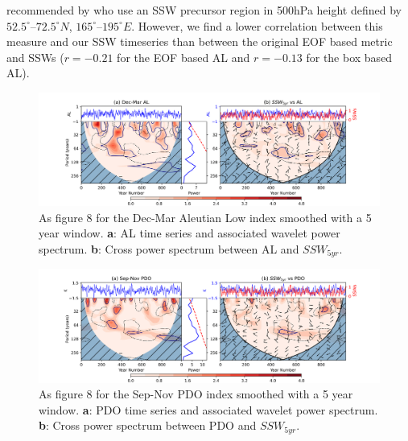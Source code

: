 recommended by \cite{Garfinkel2012whymight} who use an SSW precursor region in 500hPa height defined by $52.5^{\circ}$–$72.5^{\circ}N$, $165^{\circ}$–$195^{\circ}E$. However, we find a lower correlation between this measure and our SSW timeseries than between the original EOF based metric and SSWs ($r = -0.21$ for the EOF based AL and $r = -0.13$ for the box based AL).


\begin{figure}[h!]
\begin{center}
\includegraphics[width = \linewidth]{Figures/Figures-origins/AL_wavelet_combined.png}
\caption{As figure 8 for the Dec-Mar Aleutian Low index smoothed with a 5 year window. \textbf{a}: AL time series and associated wavelet power spectrum. \textbf{b}: Cross power spectrum between AL and $SSW_{5yr}$.}
\label{fig:AL_wavelet}
\end{center}
\end{figure}

\begin{figure}[h!]
\begin{center}
\includegraphics[width = \linewidth]{Figures/Figures-origins/PDO_wavelet_combined.png}
\caption{As figure 8 for the Sep-Nov PDO index smoothed with a 5 year window. \textbf{a}: PDO time series and associated wavelet power spectrum. \textbf{b}: Cross power spectrum between PDO and $SSW_{5yr}$.}
\label{fig:PDO_wavelet}
\end{center}
\end{figure}

